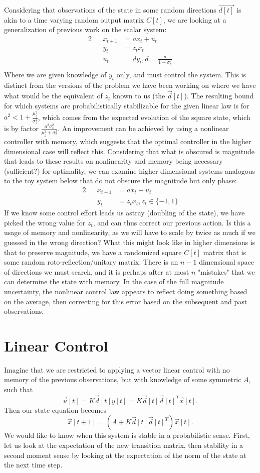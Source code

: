 \documentclass[letterpaper]{article}
\theoremstyle{remark}
\newcommand{\eqn}[1]{\begin{alignat*}{2}#1\end{alignat*}}
\begin{document}
Considering that observations of the state in some random directions $\vec{d[t]}$ is akin to a time varying random output matrix $C[t]$, we are looking at a generalization of previous work on the scalar system:
\eqn{
&&x_{t+1} &= ax_t + u_t\\
&&y_t &= z_tx_t\\
&&u_t &= dy_t, d = \frac{a}{1+\sigma_z^2}\\
}
Where we are given knowledge of $y_t$ only, and must control the system. This is distinct from the versions of the problem we have been working on where we have what would be the equivalent of $z_t$ known to us (the $\vec{d}[t]$). The resulting bound for which systems are probabilistically stabilizable for the given linear law is for $a^2 < 1 + \frac{\mu_z^2}{\sigma_z^2}$, which comes from the expected evolution of the square state, which is by factor $\frac{a^2\sigma_z^2}{\mu_z^2 +\sigma_z^2}$. An improvement can be achieved by using a nonlinear controller with memory, which suggests that the optimal controller in the higher dimensional case will reflect this. Considering that what is obscured is magnitude that leads to these results on nonlinearity and memory being necessary (sufficient?) for optimality, we can examine higher dimensional systems analogous to the toy system below that do not obscure the magnitude but only phase:
\eqn{
&&x_{t + 1} &= ax_t + u_t\\
&&y_t &= z_tx_t, z_t \in \{-1, 1\}
}
If we know some control effort leads us astray (doubling of the state), we have picked the wrong value for $z_t$, and can thus correct our previous action. Is this a usage of memory and nonlinearity, as we will have to scale by twice as much if we guessed in the wrong direction?  What this might look like in higher dimensions is that to preserve magnitude, we have a randomized square $C[t]$ matrix that is some random roto-reflection/unitary matrix. There is an $n-1$ dimensional space of directions we must search, and it is perhaps after at most $n$ "mistakes" that we can determine the state with memory. In the case of the full magnitude uncertainty, the nonlinear control law appears to reflect doing something based on the average, then correcting for this error based on the subsequent and past observations.

\section*{Linear Control}
Imagine that we are restricted to applying a vector linear control with no memory of the previous observations, but with knowledge of some symmetric $A$, such that
\[
    \vec{u}[t] = K\vec{d}[t]y[t] = K\vec{d}[t]\vec{d}[t]^T\vec{x}[t].
\]
Then our state equation becomes
\[
    \vec{x}[t + 1] = (A + K\vec{d}[t]\vec{d}[t]^T)\vec{x}[t].
\]
We would like to know when this system is stable in a probabilistic sense. First, let us look at the expectation of the new transition matrix, then stability in a second moment sense by looking at the expectation of the norm of the state at the next time step.
\end{document}
